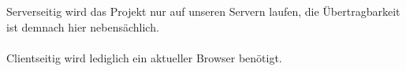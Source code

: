 Serverseitig wird das Projekt nur auf unseren Servern laufen, die Übertragbarkeit ist demnach hier nebensächlich.\\
\\
Clientseitig wird lediglich ein aktueller Browser benötigt.